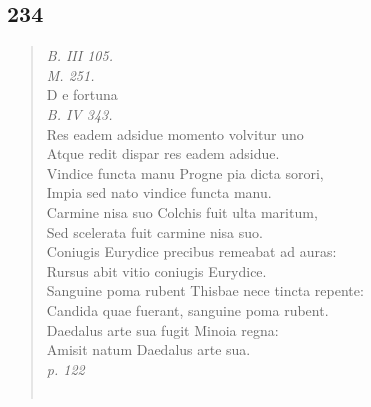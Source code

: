 \documentclass[11pt, a4paper]{report}
\begin{document}
            \subsection*{234}
      \begin{verse}
      \textit{B. III 105.} \\ \textit{M. 251.} \\ D e fortuna \\ \textit{B. IV 343.} \\ Res eadem adsidue momento volvitur uno \\ Atque redit dispar res eadem adsidue. \\ Vindice functa manu Progne pia dicta sorori, \\ Impia sed nato vindice functa manu. \\ Carmine nisa suo Colchis fuit ulta maritum, \\ Sed scelerata fuit carmine nisa suo. \\ Coniugis Eurydice precibus remeabat ad auras: \\ Rursus abit vitio coniugis Eurydice. \\ Sanguine poma rubent Thisbae nece tincta repente: \\ Candida quae fuerant, sanguine poma rubent. \\ Daedalus arte sua fugit Minoia regna: \\ Amisit natum Daedalus arte sua. \\ \textit{p. 122} \\ 
        ﻿\pagebreak 

\end{verse}
\end{document}
